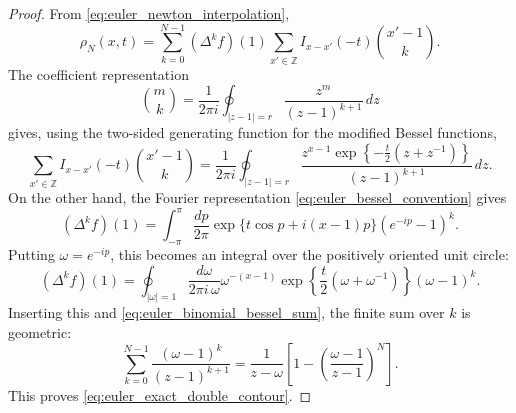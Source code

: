 \documentclass[11pt]{article}
\numberwithin{equation}{section}
\newcommand{\Z}{\mathbb Z}
\newcommand{\1}{\mathbf 1}
\begin{document}
\begin{proof}
From \eqref{eq:euler_newton_interpolation},
\[
    \rho_N(x,t)
    =
    \sum_{k=0}^{N-1}(\Delta^k f)(1)
    \sum_{x'\in\Z}I_{x-x'}(-t)\binom{x'-1}{k}.
\]
The coefficient representation
\[
    \binom{m}{k}
    =
    \frac{1}{2\pi i}
    \oint_{|z-1|=r}
    \frac{z^m}{(z-1)^{k+1}}\,dz
\]
gives, using the two-sided generating function for the modified Bessel
functions,
\begin{equation}
    \sum_{x'\in\Z}I_{x-x'}(-t)\binom{x'-1}{k}
    =
    \frac{1}{2\pi i}
    \oint_{|z-1|=r}
    \frac{
        z^{x-1}\exp\left\{-\frac{t}{2}(z+z^{-1})\right\}
    }{(z-1)^{k+1}}\,dz .
    \label{eq:euler_binomial_bessel_sum}
\end{equation}
On the other hand, the Fourier representation
\eqref{eq:euler_bessel_convention} gives
\[
    (\Delta^k f)(1)
    =
    \int_{-\pi}^{\pi}\frac{dp}{2\pi}
    \exp\{t\cos p+i(x-1)p\}
    (e^{-ip}-1)^k .
\]
Putting \(\omega=e^{-ip}\), this becomes an integral over the positively
oriented unit circle:
\[
    (\Delta^k f)(1)
    =
    \oint_{|\omega|=1}
    \frac{d\omega}{2\pi i\,\omega}
    \omega^{-(x-1)}
    \exp\left\{\frac{t}{2}(\omega+\omega^{-1})\right\}
    (\omega-1)^k .
\]
Inserting this and \eqref{eq:euler_binomial_bessel_sum}, the finite sum over
\(k\) is geometric:
\[
    \sum_{k=0}^{N-1}
    \frac{(\omega-1)^k}{(z-1)^{k+1}}
    =
    \frac{1}{z-\omega}
    \left[
        1-
        \left(\frac{\omega-1}{z-1}\right)^N
    \right].
\]
This proves \eqref{eq:euler_exact_double_contour}.
\end{proof}
\end{document}
